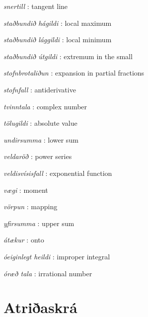 \documentclass[b5paper,11pt,icelandic]{sphinxmanual}
\begin{document}
\emph{snertill} : tangent line

\emph{staðbundið hágildi} : local maximum

\emph{staðbundið lággildi} : local minimum

\emph{staðbundið útgildi} : extremum in the small

\emph{stofnbrotaliðun} : expansion in partial fractions

\emph{stofnfall} : antiderivative

\emph{tvinntala} : complex number


\emph{tölugildi} : absolute value

\emph{undirsumma} : lower sum


\emph{veldaröð} : power series


\emph{veldisvísisfall} : exponential function


\emph{vægi} : moment

\emph{vörpun} : mapping

\emph{yfirsumma} : upper sum


\emph{átækur} : onto

\emph{óeiginlegt heildi} : improper integral


\emph{óræð tala} : irrational number


\chapter{Atriðaskrá}
\printindex
\end{document}
